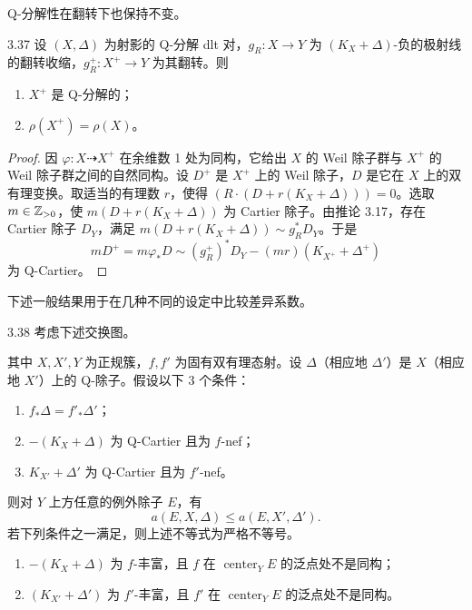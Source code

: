 Q-分解性在翻转下也保持不变。

\begin{propositionp}{3.37}
设 $(X,\Delta)$ 为射影的 Q-分解 dlt 对，$g_R:X\to Y$ 为 $(K_X+\Delta)$-负的极射线的翻转收缩，$g_R^{+}:X^{+}\to Y$ 为其翻转。则
\begin{enumerate}[label=(\arabic*)]
\item $X^{+}$ 是 Q-分解的；
\item $\rho(X^{+})=\rho(X)$。
\end{enumerate}
\end{propositionp}

\begin{proof}
因 $\varphi:X\dashrightarrow X^{+}$ 在余维数 1 处为同构，它给出 $X$ 的 Weil 除子群与 $X^{+}$ 的 Weil 除子群之间的自然同构。设 $D^{+}$ 是 $X^{+}$ 上的 Weil 除子，$D$ 是它在 $X$ 上的双有理变换。取适当的有理数 $r$，使得 $(R\cdot(D+r(K_X+\Delta)))=0$。选取 $m\in\mathbb{Z}_{>0}$，使 $m(D+r(K_X+\Delta))$ 为 Cartier 除子。由推论 3.17，存在 Cartier 除子 $D_Y$，满足 $m(D+r(K_X+\Delta))\sim g_R^*D_Y$。于是
\[
mD^{+} = m\varphi_*D \sim (g_R^{+})^*D_Y-(mr)(K_{X^{+}}+\Delta^{+})
\]
为 Q-Cartier。
\end{proof}

下述一般结果用于在几种不同的设定中比较差异系数。

\begin{lemmap}{3.38}
考虑下述交换图。
\begin{center}
\end{center}
其中 $X,X',Y$ 为正规簇，$f,f'$ 为固有双有理态射。设 $\Delta$（相应地 $\Delta'$）是 $X$（相应地 $X'$）上的 Q-除子。假设以下 3 个条件：
\begin{enumerate}[label=(\arabic*)]
\item $f_*\Delta=f'_*\Delta'$；
\item $-(K_X+\Delta)$ 为 Q-Cartier 且为 $f$-nef；
\item $K_{X'}+\Delta'$ 为 Q-Cartier 且为 $f'$-nef。
\end{enumerate}
则对 $Y$ 上方任意的例外除子 $E$，有
\[
a(E,X,\Delta)\le a(E,X',\Delta').
\]
若下列条件之一满足，则上述不等式为严格不等号。
\begin{enumerate}[label=(\arabic*),start=4]
\item $-(K_X+\Delta)$ 为 $f$-丰富，且 $f$ 在 $\operatorname{center}_Y E$ 的泛点处不是同构；
\item $(K_{X'}+\Delta')$ 为 $f'$-丰富，且 $f'$ 在 $\operatorname{center}_Y E$ 的泛点处不是同构。
\end{enumerate}
\end{lemmap}

